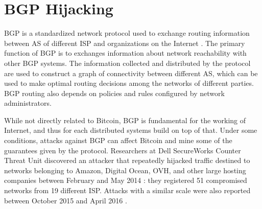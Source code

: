 \section{BGP Hijacking}
\ac{BGP} is a standardized network protocol used to exchange routing information between \ac{AS} \cite{autonomous_systems_wikipedia} of different \ac{ISP} and organizations on the Internet \cite{rfc4271, bgp_wikipedia}.
The primary function of \ac{BGP} is to exchanges information about network reachability with other \ac{BGP} systems.
The information collected and distributed by the protocol are used to construct a graph of connectivity between different \ac{AS}, which can be used to make optimal routing decisions among the networks of different parties.
\ac{BGP} routing also depends on policies and rules configured by network administrators.

\bigskip
While not directly related to Bitcoin, \ac{BGP} is fundamental for the working of Internet, and thus for each distributed systems build on top of that.
Under some conditions, attacks against \ac{BGP} can affect Bitcoin and mine some of the guarantees given by the protocol.
Researchers at Dell SecureWorks Counter Threat Unit discovered an attacker that repeatedly hijacked traffic destined to networks belonging to Amazon, Digital Ocean, OVH, and other large hosting companies between February and May 2014 \cite{bgp_hijacking_secureworks}:
they registered \num{51} compromised networks from \num{19} different \ac{ISP}.
Attacks with a similar scale were also reported between October 2015 and April 2016 \cite{hijacking_bitcoin_2017, bgpstream}.

\pagebreak

